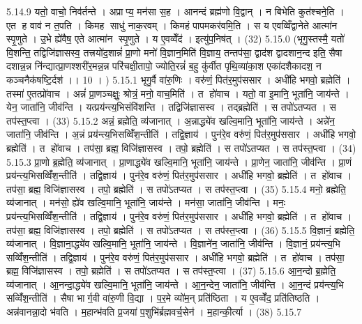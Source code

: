 5.14.9
यतो॒ वाचो॒ निव॑र्तन्ते । अप्राप्य॒ मन॑सा स॒ह । आनन्दं ब्रह्म॑णो वि॒द्वान् । न बिभेति कुत॑श्चने॒ति । एत ह वाव॑ न त॒पति । किमह साधु॑ नाक॒रवम् । किमहं पापमकर॑वमि॒ति । स य एवव्विँद्वानेते आत्मा॑न स्पृ॒णुते । उ॒भे ह्ये॑वैष॒ एते आत्मा॑न स्पृ॒णुते । य ए॒वव्वेँद॑ । इत्यु॑प॒निष॑त् । (32)
5.15.0
(भृगु॒स्तस्मै॒ यतो॑ वि॒शन्ति॒ तद्विजि॑ज्ञासस्व॒ तत्त्रयो॑द॒शान्नं॑ प्रा॒णो मनो॑ वि॒ज्ञान॒मिति॑ वि॒ज्ञाय॒ तन्तप॑सा॒ द्वाद॑श द्वादशान॒न्द इति॒ सैषा दशान्न॒न्न नि॑न्द्यात्प्रा॒णश्शरी॑र॒मन्न॒न्न परि॑चक्षी॒तापो॒ ज्योति॒रन्नं॑ ब॒हु कु॑र्वीत पृथि॒व्या॑का॒श एका॑दशैकादश॒ न कञ्चनैक॑षष्टि॒र्दश॑ ।। 10 । )
5.15.1
भृगु॒र्वै वा॑रु॒णिः । वरु॑णं॒ पित॑र॒मुप॑ससार । अधी॑हि भगवो॒ ब्रह्मेति॑ । तस्मा॑ ए॒तत्प्रो॑वाच । अन्नं॑ प्रा॒णञ्चक्षुः॒ श्रोत्रं॒ मनो॒ वाच॒मिति॑ । त हो॑वाच । यतो॒ वा इ॒मानि॒ भूता॑नि॒ जाय॑न्ते । येन॒ जाता॑नि॒ जीव॑न्ति । यत्प्रय॑न्त्य॒भिसंवि॑शन्ति । तद्विजि॑ज्ञासस्व । तद्ब्रह्मेति॑ । स तपो॑ऽतप्यत । स तप॑स्त॒प्त्वा । (33)
5.15.2
अन्नं॒ ब्रह्मेति॒ व्य॑जानात् । अ॒न्नाद्ध्ये॑व खल्वि॒मानि॒ भूता॑नि॒ जाय॑न्ते । अन्ने॑न॒ जाता॑नि॒ जीव॑न्ति । अ॒न्नं प्रय॑न्त्य॒भिसव्विँ॑श॒न्तीति॑ । तद्वि॒ज्ञाय॑ । पुन॑रे॒व वरु॑णं॒ पित॑र॒मुप॑ससार । अधी॑हि भगवो॒ ब्रह्मेति॑ । त हो॑वाच । तप॑सा॒ ब्रह्म॒ विजि॑ज्ञासस्व । तपो॒ ब्रह्मेति॑ । स तपो॑ऽतप्यत । स तप॑स्त॒प्त्वा । (34)
5.15.3
प्रा॒णो ब्र॒ह्मेति॒ व्य॑जानात् । प्रा॒णाद्ध्ये॑व खल्वि॒मानि॒ भूता॑नि॒ जाय॑न्ते । प्रा॒णेन॒ जाता॑नि॒ जीव॑न्ति । प्रा॒णं प्रय॑न्त्य॒भिसव्विँ॑श॒न्तीति॑ । तद्वि॒ज्ञाय॑ । पुन॑रे॒व वरु॑णं॒ पित॑र॒मुप॑ससार । अधी॑हि भगवो॒ ब्रह्मेति॑ । त हो॑वाच । तप॑सा॒ ब्रह्म॒ विजि॑ज्ञासस्व । तपो॒ ब्रह्मेति॑ । स तपो॑ऽतप्यत । स तप॑स्त॒प्त्वा । (35)
5.15.4
मनो॒ ब्रह्मेति॒ व्य॑जानात् । मन॑सो॒ ह्ये॑व खल्वि॒मानि॒ भूता॑नि॒ जाय॑न्ते । मन॑सा॒ जाता॑नि॒ जीव॑न्ति । मनः॒ प्रय॑न्त्य॒भिसव्विँ॑श॒न्तीति॑ । तद्वि॒ज्ञाय॑ । पुन॑रे॒व वरु॑णं॒ पित॑र॒मुप॑ससार । अधी॑हि भगवो॒ ब्रह्मेति॑ । त हो॑वाच । तप॑सा॒ ब्रह्म॒ विजि॑ज्ञासस्व । तपो॒ ब्रह्मेति॑ । स तपो॑ऽतप्यत । स तप॑स्त॒प्त्वा । (36)
5.15.5
वि॒ज्ञानं॒ ब्रह्मेति॒ व्य॑जानात् । वि॒ज्ञाना॒द्ध्ये॑व खल्वि॒मानि॒ भूता॑नि॒ जाय॑न्ते । वि॒ज्ञाने॑न॒ जाता॑नि॒ जीव॑न्ति । वि॒ज्ञानं॒ प्रय॑न्त्य॒भि सव्विँ॑श॒न्तीति॑ । तद्वि॒ज्ञाय॑ । पुन॑रे॒व वरु॑णं॒ पित॑र॒मुप॑ससार । अधी॑हि भगवो॒ ब्रह्मेति॑ । त हो॑वाच । तप॑सा॒ ब्रह्म॒ विजि॑ज्ञासस्व । तपो॒ ब्रह्मेति॑ । स तपो॑ऽतप्यत । स तप॑स्त॒प्त्वा । (37)
5.15.6
आ॒न॒न्दो ब्र॒ह्मेति॒ व्य॑जानात् । आ॒नन्दा॒द्ध्ये॑व खल्वि॒मानि॒ भूता॑नि॒ जाय॑न्ते । आ॒न॒न्देन॒ जाता॑नि॒ जीव॑न्ति । आ॒न॒न्दं प्रय॑न्त्य॒भि सव्विँ॑श॒न्तीति॑ । सैषा भार्ग॒वी वा॑रु॒णी वि॒द्या । प॒र॒मे व्यो॑म॒न् प्रति॑ष्ठिता । य ए॒वव्वेँद॒ प्रति॑तिष्ठति । अन्न॑वानन्ना॒दो भ॑वति । म॒हान्भ॑वति प्र॒जया॑ प॒शुभि॑र्ब्रह्मवर्च॒सेन॑ । म॒हान्की॒र्त्या । (38)
5.15.7
